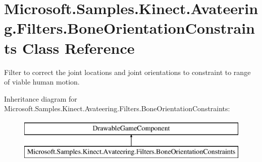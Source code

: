 \hypertarget{class_microsoft_1_1_samples_1_1_kinect_1_1_avateering_1_1_filters_1_1_bone_orientation_constraints}{\section{Microsoft.\+Samples.\+Kinect.\+Avateering.\+Filters.\+Bone\+Orientation\+Constraints Class Reference}
\label{class_microsoft_1_1_samples_1_1_kinect_1_1_avateering_1_1_filters_1_1_bone_orientation_constraints}
}


Filter to correct the joint locations and joint orientations to constraint to range of viable human motion.  


Inheritance diagram for Microsoft.\+Samples.\+Kinect.\+Avateering.\+Filters.\+Bone\+Orientation\+Constraints\+:\begin{figure}[H]
\begin{center}
\leavevmode
\includegraphics[height=2.000000cm]{class_microsoft_1_1_samples_1_1_kinect_1_1_avateering_1_1_filters_1_1_bone_orientation_constraints}
\end{center}
\end{figure}
